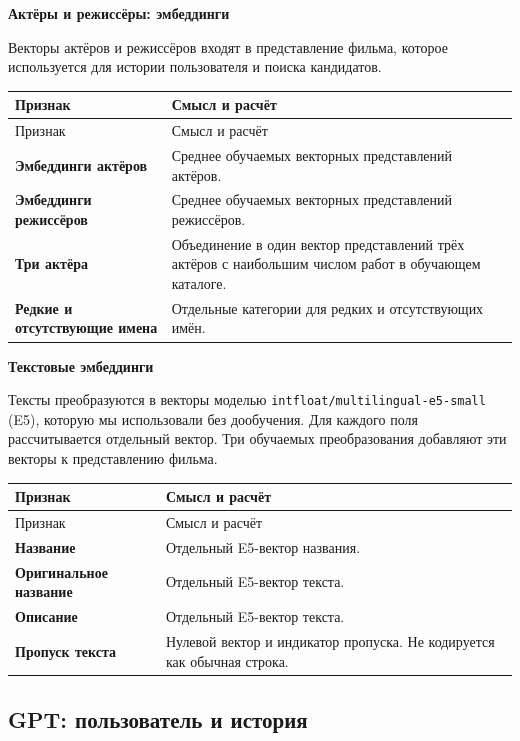 \documentclass[11pt,a4paper]{article}
\begin{document}
\textbf{Актёры и режиссёры: эмбеддинги}

Векторы актёров и режиссёров входят в представление фильма, которое используется для истории пользователя и поиска кандидатов.

\begin{longtable}{>{\raggedright\arraybackslash}p{4.1cm}>{\raggedright\arraybackslash}p{10.8cm}}
\toprule
Признак & Смысл и расчёт \\
\midrule
\endfirsthead
\toprule
Признак & Смысл и расчёт \\
\midrule
\endhead
\textbf{Эмбеддинги актёров} & Среднее обучаемых векторных представлений актёров. \\[4pt]
\textbf{Эмбеддинги режиссёров} & Среднее обучаемых векторных представлений режиссёров. \\[4pt]
\textbf{Три актёра} & Объединение в один вектор представлений трёх актёров с наибольшим числом работ в обучающем каталоге. \\[4pt]
\textbf{Редкие и отсутствующие имена} & Отдельные категории для редких и отсутствующих имён. \\[4pt]
\bottomrule
\end{longtable}

\textbf{Текстовые эмбеддинги}

Тексты преобразуются в векторы моделью \texttt{intfloat/multilingual-e5-small} (E5), которую мы использовали без дообучения. Для каждого поля рассчитывается отдельный вектор. Три обучаемых преобразования добавляют эти векторы к представлению фильма.


\begin{longtable}{>{\raggedright\arraybackslash}p{4.1cm}>{\raggedright\arraybackslash}p{10.8cm}}
\toprule
Признак & Смысл и расчёт \\
\midrule
\endfirsthead
\toprule
Признак & Смысл и расчёт \\
\midrule
\endhead
\textbf{Название} & Отдельный E5-вектор названия. \\[4pt]
\textbf{Оригинальное название} & Отдельный E5-вектор текста. \\[4pt]
\textbf{Описание} & Отдельный E5-вектор текста. \\[4pt]
\textbf{Пропуск текста} & Нулевой вектор и индикатор пропуска. Не кодируется как обычная строка. \\[4pt]
\bottomrule
\end{longtable}

\newpage

\subsection{GPT: пользователь и история}
\end{document}
